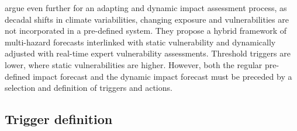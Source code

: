{\autocite{boultDroughtImpactbasedForecasting2022} argue even further for an adapting and dynamic impact assessment process, as decadal shifts in climate variabilities, changing exposure and vulnerabilities are not incorporated in a pre-defined system. They propose a hybrid framework of multi-hazard forecasts interlinked with static vulnerability and dynamically adjusted with real-time expert vulnerability assessments. Threshold triggers are lower, where static vulnerabilities are higher. However, both the regular pre-defined impact forecast and the dynamic impact forecast must be preceded by a selection and definition of triggers and actions.



\subsection*{Trigger definition}

}
